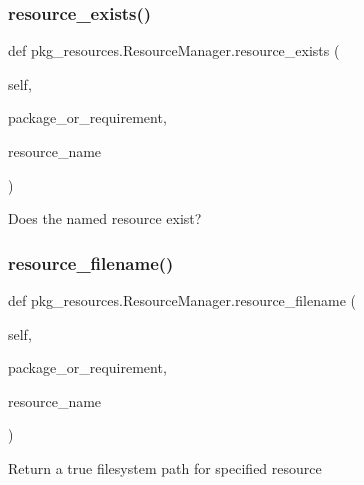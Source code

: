 \subsubsection{\texorpdfstring{resource\+\_\+exists()}{resource\_exists()}}
{\footnotesize\ttfamily def pkg\+\_\+resources.\+Resource\+Manager.\+resource\+\_\+exists (\begin{DoxyParamCaption}\item[{}]{self,  }\item[{}]{package\+\_\+or\+\_\+requirement,  }\item[{}]{resource\+\_\+name }\end{DoxyParamCaption})}

\begin{DoxyVerb}Does the named resource exist?\end{DoxyVerb}
 \mbox{\label{classpkg__resources_1_1_resource_manager_a6c85868c8de9cb637490e298ff1252c0}} 
\subsubsection{\texorpdfstring{resource\+\_\+filename()}{resource\_filename()}}
{\footnotesize\ttfamily def pkg\+\_\+resources.\+Resource\+Manager.\+resource\+\_\+filename (\begin{DoxyParamCaption}\item[{}]{self,  }\item[{}]{package\+\_\+or\+\_\+requirement,  }\item[{}]{resource\+\_\+name }\end{DoxyParamCaption})}

\begin{DoxyVerb}Return a true filesystem path for specified resource\end{DoxyVerb}
 \mbox{\label{classpkg__resources_1_1_resource_manager_a32204e72f09b8a5f92e50d8ef1636bc6}} 
